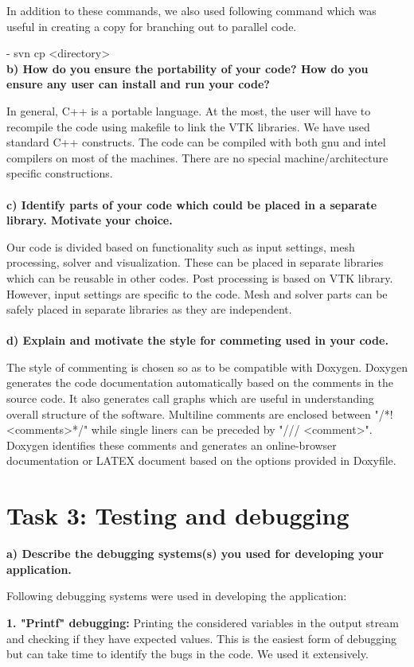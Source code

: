 \documentclass[a4paper, 11pt, oneside]{scrartcl}
\begin{document}
In addition to these commands, we also used following command which was useful in creating a copy for branching out to parallel code.

- svn cp <directory>
\\
\textbf{b) How do you ensure the portability of your code? How do you ensure any user can install and run your code?}

In general, C++ is a portable language. At the most, the user will have to recompile the code using makefile to link the VTK libraries. We have used standard C++ constructs. The code can be compiled with both gnu and intel compilers on most of the machines. There are no special machine/architecture specific constructions.
\\
\\
\textbf{c) Identify parts of your code which could be placed in a separate library. Motivate your choice.}

Our code is divided based on functionality such as input settings, mesh processing, solver and visualization. These can be placed in separate libraries which can be reusable in other codes. Post processing is based on VTK library. However, input settings are specific to the code. Mesh and solver parts can be safely placed in separate libraries as they are independent. 
\\
\\
\textbf{d) Explain and motivate the style for commeting used in your code.}

The style of commenting is chosen so as to be compatible with Doxygen. Doxygen generates the code documentation automatically based on the comments in the source code. It also generates call graphs which are useful in understanding overall structure of the software. Multiline comments are enclosed between "/*!<comments>*/" while single liners can be preceded by "/// <comment>". Doxygen identifies these comments and generates an online-browser documentation or LATEX document based on the options provided in Doxyfile.

\section*{Task 3: Testing and debugging}
\textbf{a) Describe the debugging systems(s) you used for developing your application.}

Following debugging systems were used in developing the application:

\textbf{1. "Printf" debugging:} Printing the considered variables in the output stream and checking if they have expected values. This is the easiest form of debugging but can take time to identify the bugs in the code. We used it extensively.
\end{document}
